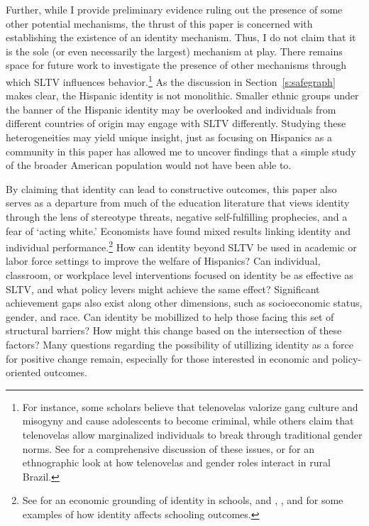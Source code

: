 \documentclass[11pt]{article}
\begin{document}
Further, while I provide preliminary evidence ruling out the presence of some other potential mechanisms, the thrust of this paper is concerned with establishing the existence of an identity mechanism. Thus, I do not claim that it is the sole (or even necessarily the largest) mechanism at play. There remains space for future work to investigate the presence of other mechanisms through which SLTV influences behavior.\footnote{ For instance, some scholars believe that telenovelas valorize gang culture and misogyny and cause adolescents to become criminal, while others claim that telenovelas allow marginalized individuals to break through traditional gender norms. See \cite{benavides2009drugs} for a comprehensive discussion of these issues, or \cite{la2004telenovela} for an ethnographic look at how telenovelas and gender roles interact in rural Brazil.} As the discussion in Section~\ref{s:safegraph} makes clear, the Hispanic identity is not monolithic. Smaller ethnic groups under the banner of the Hispanic identity may be overlooked and individuals from different countries of origin may engage with SLTV differently. Studying these heterogeneities may yield unique insight, just as focusing on Hispanics as a community in this paper has allowed me to uncover findings that a simple study of the broader American population would not have been able to. 

By claiming that identity can lead to constructive outcomes, this paper also serves as a departure from much of the education literature that views identity through the lens of stereotype threats, negative self-fulfilling prophecies, and a fear of `acting white.' Economists have found mixed results linking identity and individual performance.\footnote{ See \cite{akerlof2002identity} for an economic grounding of identity in schools, and \cite{fryer2010empirical}, \cite{deming2014school}, and \cite{gershenson2018long} for some examples of how identity affects schooling outcomes. } How can identity beyond SLTV be used in academic or labor force settings to improve the welfare of Hispanics? Can individual, classroom, or workplace level interventions focused on identity be as effective as SLTV, and what policy levers might achieve the same effect? Significant achievement gaps also exist along other dimensions, such as socioeconomic status, gender, and race. Can identity be mobillized to help those facing this set of structural barriers? How might this change based on the intersection of these factors?  Many questions regarding the possibility of utillizing identity as a force for positive change remain, especially for those interested in economic and policy-oriented outcomes. 
\end{document}
